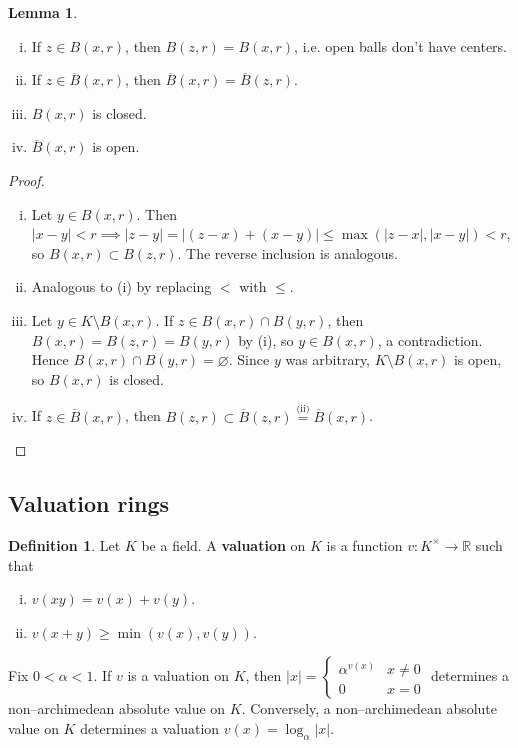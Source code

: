 \documentclass{article}
\theoremstyle{definition}
\newtheorem{lemma}[theorem]{Lemma}
\newtheorem{defn}{Definition}[section]
\begin{document}
\begin{lemma}
    \begin{enumerate}[(i)]
        \item If $z \in B(x,r)$, then $B(z,r) = B(x,r)$, i.e. open balls don't have centers.
        \item If $z \in \overline{B}(x,r)$, then $\overline{B}(x,r) = \overline{B}(z,r)$.
        \item $B(x,r)$ is closed.
        \item $\overline{B}(x,r)$ is open.
    \end{enumerate}
\end{lemma}
\begin{proof}
    \begin{enumerate}[(i)]
        \item Let $y \in B(x,r)$. Then $|x-y|<r \implies |z-y| = |(z-x) + (x-y)| \le \max(|z-x|,|x-y|) < r$, so $B(x,r) \subset B(z,r)$. The reverse inclusion is analogous.
        \item Analogous to (i) by replacing $<$ with $\le$.
        \item Let $y \in K \setminus B(x,r)$. If $z \in B(x,r) \cap B(y,r)$, then $B(x,r) = B(z,r) = B(y,r)$ by (i), so $y \in B(x,r)$, a contradiction. Hence $B(x,r) \cap B(y,r) = \varnothing$. Since $y$ was arbitrary, $K \setminus B(x,r)$ is open, so $B(x,r)$ is closed.
        \item If $z \in \overline{B}(x,r)$, then $B(z,r) \subset \overline{B}(z,r) \stackrel{\text{(ii)}}{=} \overline{B}(x,r)$.
    \end{enumerate}
\end{proof}

\subsection{Valuation rings}
\begin{defn}
    Let $K$ be a field. A \textbf{valuation} on $K$ is a function $v : K^\times \to \mathbb{R}$ such that 
    \begin{enumerate}[(i)]
        \item $v(xy) = v(x)+v(y)$.
        \item $v(x+y) \ge \min(v(x),v(y))$.
    \end{enumerate}
\end{defn}
Fix $0<\alpha<1$. If $v$ is a valuation on $K$, then $|x| = \begin{cases}
    \alpha^{v(x)} & x \neq 0\\
    0 & x = 0
\end{cases}$
determines a non--archimedean absolute value on $K$. Conversely, a non--archimedean absolute value on $K$ determines a valuation $v(x) = \log_{\alpha} |x|$.
\end{document}
